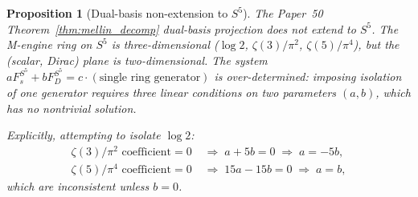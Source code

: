 \documentclass[11pt,a4paper]{article}
\theoremstyle{plain}
\newtheorem{proposition}[theorem]{Proposition}
\theoremstyle{definition}
\begin{document}
\begin{proposition}[Dual-basis non-extension to $S^{5}$]
\label{prop:dual_basis_S5}
The Paper~50 Theorem~\ref{thm:mellin_decomp} dual-basis projection
does not extend to $S^{5}$. The M-engine ring on $S^{5}$ is
three-dimensional ($\log 2$, $\zeta(3)/\pi^{2}$, $\zeta(5)/\pi^{4}$),
but the (scalar, Dirac) plane is two-dimensional. The system
$a F_{s}^{S^{5}} + b F_{D}^{S^{5}} = c \cdot (\text{single ring generator})$
is over-determined: imposing isolation of one generator requires three
linear conditions on two parameters $(a, b)$, which has no nontrivial
solution.

Explicitly, attempting to isolate $\log 2$:
\begin{align}
\zeta(3)/\pi^{2}\text{ coefficient} = 0 \;&\Longrightarrow\; a + 5b = 0 \;\Longrightarrow\; a = -5b,\\
\zeta(5)/\pi^{4}\text{ coefficient} = 0 \;&\Longrightarrow\; 15a - 15b = 0 \;\Longrightarrow\; a = b,
\end{align}
which are inconsistent unless $b = 0$.
\end{proposition}
\end{document}
